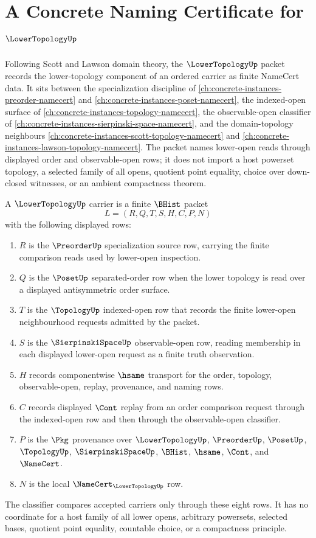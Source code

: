 \chapter{A Concrete Naming Certificate for $\LowerTopologyUp$}
\label{ch:concrete-instances-lower-topology-namecert}

Following Scott and Lawson domain theory, the $\LowerTopologyUp$ packet records the lower-topology component of an ordered carrier as finite NameCert data. It sits between the specialization discipline of \autoref{ch:concrete-instances-preorder-namecert} and \autoref{ch:concrete-instances-poset-namecert}, the indexed-open surface of \autoref{ch:concrete-instances-topology-namecert}, the observable-open classifier of \autoref{ch:concrete-instances-sierpinski-space-namecert}, and the domain-topology neighbours \autoref{ch:concrete-instances-scott-topology-namecert} and \autoref{ch:concrete-instances-lawson-topology-namecert}. The packet names lower-open reads through displayed order and observable-open rows; it does not import a host powerset topology, a selected family of all opens, quotient point equality, choice over down-closed witnesses, or an ambient compactness theorem.

\begin{definition}
\label{def:lower-topology-carrier}
A $\LowerTopologyUp$ carrier is a finite $\BHist$ packet
$$
L=(R,Q,T,S,H,C,P,N)
$$
with the following displayed rows:
\begin{enumerate}
\item $R$ is the $\PreorderUp$ specialization source row, carrying the finite comparison reads used by lower-open inspection.
\item $Q$ is the $\PosetUp$ separated-order row when the lower topology is read over a displayed antisymmetric order surface.
\item $T$ is the $\TopologyUp$ indexed-open row that records the finite lower-open neighbourhood requests admitted by the packet.
\item $S$ is the $\SierpinskiSpaceUp$ observable-open row, reading membership in each displayed lower-open request as a finite truth observation.
\item $H$ records componentwise $\hsame$ transport for the order, topology, observable-open, replay, provenance, and naming rows.
\item $C$ records displayed $\Cont$ replay from an order comparison request through the indexed-open row and then through the observable-open classifier.
\item $P$ is the $\Pkg$ provenance over $\LowerTopologyUp$, $\PreorderUp$, $\PosetUp$, $\TopologyUp$, $\SierpinskiSpaceUp$, $\BHist$, $\hsame$, $\Cont$, and $\NameCert$.
\item $N$ is the local $\NameCert_{\LowerTopologyUp}$ row.
\end{enumerate}
The classifier compares accepted carriers only through these eight rows. It has no coordinate for a host family of all lower opens, arbitrary powersets, selected bases, quotient point equality, countable choice, or a compactness principle.
\end{definition}

